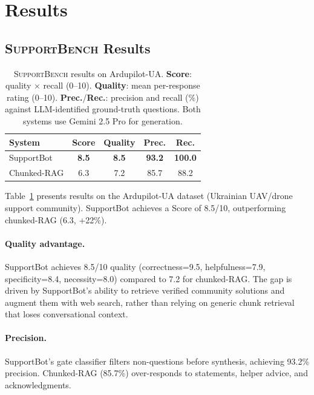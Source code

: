 \documentclass[11pt]{article}
\newcommand{\supportbench}{\textsc{SupportBench}}
\begin{document}
\section{Results}

\subsection{\supportbench{} Results}

\begin{table}[t]
\centering
\small
\begin{tabular}{lcccc}
\toprule
\textbf{System} & \textbf{Score} & \textbf{Quality} & \textbf{Prec.} & \textbf{Rec.} \\
\midrule
SupportBot      & \textbf{8.5} & \textbf{8.5} & \textbf{93.2} & \textbf{100.0} \\
Chunked-RAG     & 6.3 & 7.2 & 85.7 & 88.2 \\
\bottomrule
\end{tabular}
\caption{\supportbench{} results on Ardupilot-UA. \textbf{Score}: quality $\times$ recall (0--10). \textbf{Quality}: mean per-response rating (0--10). \textbf{Prec.}/\textbf{Rec.}: precision and recall (\%) against LLM-identified ground-truth questions. Both systems use Gemini 2.5 Pro for generation.}
\label{tab:supportbench-results}
\end{table}

Table~\ref{tab:supportbench-results} presents results on the Ardupilot-UA dataset (Ukrainian UAV/drone support community). SupportBot achieves a Score of 8.5/10, outperforming chunked-RAG (6.3, +22\%).

\paragraph{Quality advantage.} SupportBot achieves 8.5/10 quality (correctness=9.5, helpfulness=7.9, specificity=8.4, necessity=8.0) compared to 7.2 for chunked-RAG. The gap is driven by SupportBot's ability to retrieve verified community solutions and augment them with web search, rather than relying on generic chunk retrieval that loses conversational context.

\paragraph{Precision.} SupportBot's gate classifier filters non-questions before synthesis, achieving 93.2\% precision. Chunked-RAG (85.7\%) over-responds to statements, helper advice, and acknowledgments.
\end{document}
